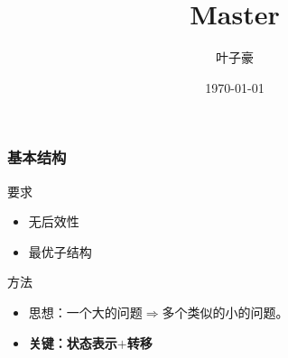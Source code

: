 \documentclass{beamer}
\begin{document}
	\begin{frame}[containsverbatim]
		\title{Master}
		\author{叶子豪}
		\date{\today}
		\titlepage
	\end{frame}
	
	\begin{frame}
		\frametitle{基本结构}
		\begin{block}{要求}
			\begin{itemize}
				\item 无后效性
				\item 最优子结构
			\end{itemize}
		\end{block}
		\pause
		\begin{alertblock}{方法}
			\begin{itemize}
				\item 思想：一个大的问题$\Rightarrow$多个类似的小的问题。
				\item \textbf{关键：状态表示$+$转移}
			\end{itemize}
		\end{alertblock}
	\end{frame}
\end{document}
